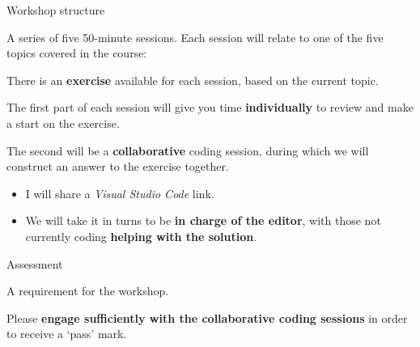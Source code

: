 \documentclass[10pt, dvipsnames, table, aspectratio=169]{beamer}
\begin{document}

\begin{frame}{Workshop structure}

A series of five 50-minute sessions.
Each session will relate to one of the five topics covered in the course:

\begin{centering}

\begin{table}[h!]

    \centering

    

\end{table}

\end{centering}

\framebreak

There is an \textbf{exercise} available for each session, based on the current topic.

The first part of each session will give you time \textbf{individually} to review and make a start on the exercise.

The second will be a \textbf{collaborative} coding session, during which we will construct an answer to the exercise together.

\begin{itemize}

  \item I will share a \emph{Visual Studio Code} link.

  \item We will take it in turns to be \textbf{in charge of the editor}, with those not currently coding \textbf{helping with the solution}.

\end{itemize}

\end{frame}


\begin{frame}[fragile]{Assessment}

A requirement for the workshop.

Please \textbf{engage sufficiently with the collaborative coding sessions} in order to receive a `pass' mark.

\end{frame}

\end{document}
